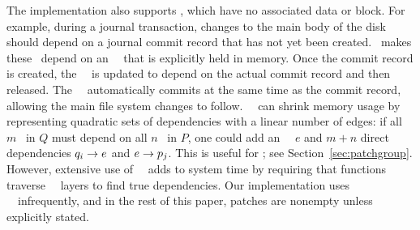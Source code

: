 The implementation also supports \emph{\noop} \patches, which have
 no associated data or block.
%
%
For example, during a journal transaction,
 changes to the main body of the disk should depend on a
 journal commit record that has not yet been created.
%
\Kudos\ makes these \patches\ depend on an \noop\ \patch\
 that is explicitly held in memory.
%
Once the commit record is created, the \noop\ \patch\ is updated to depend on
 the actual commit record and then released.
%
The \noop\ \patch\ automatically commits at the same time as the commit
 record, allowing the main file system changes to follow.
%
%
\Noop\ \patches\ can shrink memory usage by representing quadratic sets of
 dependencies with a linear number of edges: if all $m$ \patches\ in $Q$
 must depend on all $n$ \patches\ in $P$, one could
 add an \noop\ \patch\ $e$ and $m+n$ direct dependencies
 $q_i \rightarrow e$ and $e \rightarrow p_j$.
%
This is useful for \patchgroups; see Section~\ref{sec:patchgroup}.
%
However, extensive use of \noop\ \patches\ adds to system time by
 requiring that functions traverse \noop\ \patch\ layers to find true
 dependencies.
%
Our implementation uses \noop\ \patches\ infrequently, and in the
 rest of this paper, patches are nonempty unless explicitly
 stated.


\begin{comment}
To solve this problem, we introduce an additional type of \patch. The
prototypical \patch\ corresponds to some change on disk, but \Kudos\ also
supports \aemphnoop\ \patch\ type, which doesn't change the disk at all.
\Noop\ \patches\ can have \befores, like other \patches, but they don't need to
be written to disk: they are trivially satisfied when all of their \befores\ are
satisfied. Thus, they can be used to ``stand for'' entire sets of other changes.
%
This capability is extremely useful, and is used by most operations on disk
structures so that a single \patch\ can be returned that depends on the whole
change. Likewise, \anoop\ \patch\ can be passed in as a parameter to a disk
operation to make the whole operation depend on a set of other changes. \Noop\
\patches\ allow dependencies between sets with only a linear number of
dependency edges in the \patch\ graph, and without having to pass around arrays
of \patches.
%
The cost is that some functions may have to traverse trees of \noop\ \patches\
to determine true dependencies.
\end{comment}
